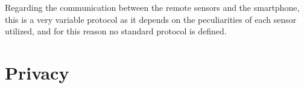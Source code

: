 Regarding the communication between the remote sensors and the smartphone, this is a very variable protocol as it depends on the peculiarities of each sensor utilized, and for this reason no standard protocol is defined.

%
%
%
%
%
%
%
%
%



\section{Privacy}
\label{chapter:privacy}

